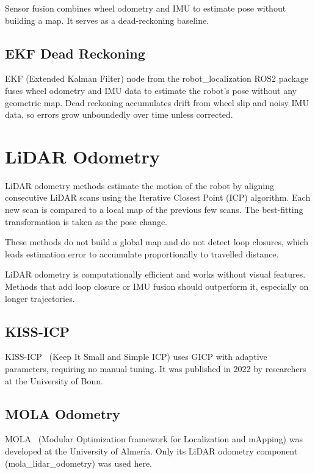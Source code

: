 Sensor fusion combines wheel odometry and IMU to estimate pose without building a map.
It serves as a dead-reckoning baseline.

\subsection{EKF Dead Reckoning}

EKF (Extended Kalman Filter) node from the robot\_localization ROS2 package fuses wheel
odometry and IMU data to estimate the robot's pose without any geometric map.
Dead reckoning accumulates drift from wheel slip and noisy IMU data, so errors grow
unboundedly over time unless corrected.

\section{LiDAR Odometry}

LiDAR odometry methods estimate the motion of the robot by aligning consecutive LiDAR scans
using the Iterative Closest Point (ICP) algorithm. Each new scan is compared to a local map of the previous few scans.
The best-fitting transformation is taken as the pose change.

These methods do not build a global map and do not detect loop closures, which
leads estimation error to accumulate proportionally to travelled distance.

LiDAR odometry is computationally efficient and works without visual features.
Methods that add loop closure or IMU fusion should outperform it, 
especially on longer trajectories.

\subsection{KISS-ICP}

KISS-ICP~\cite{vizzo2023kissicp} (Keep It Small and Simple ICP) uses GICP with adaptive
parameters, requiring no manual tuning.
It was published in 2022 by researchers at the University of Bonn.

\subsection{MOLA Odometry}

MOLA~\cite{mola_docs} (Modular Optimization framework for Localization and mApping) was
developed at the University of Almería.
Only its LiDAR odometry component
(mola\_lidar\_odometry) was used here.

